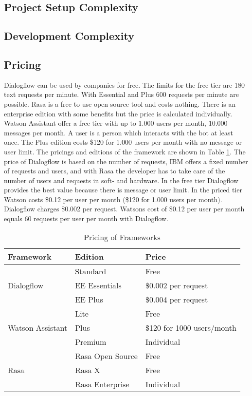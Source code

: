 \subsection*{Project Setup Complexity}

\subsection*{Development Complexity}
\subsection*{Pricing} \label{sec:pricing}
Dialogflow can be used by companies for free.
The limits for the free tier are 180 text requests per minute.
With Essential and Plus 600 requests per minute are possible.
Rasa is a free to use open source tool and costs nothing.
There is an enterprise edition with some benefits but the price
is calculated individually.
Watson Assistant offer a free tier with up to 1.000 users per month, 
10.000 messages per month.
A user is a person which interacts with the bot at least once.
The Plus edition costs \$120 for 1.000 users per month with
no message or user limit.
The pricings and editions of the framework are shown in Table \ref{tab:pricing}.
The price of Dialogflow is based on the number of requests,
IBM offers a fixed number of requests and users, and with Rasa the developer has
to take care of the number of users and requests in soft- and hardware.
In the free tier Dialogflow provides the best value because there is message or user limit.
In the priced tier Watson costs \$0.12 per user per month (\$120 for 1.000 users per month).
Dialogflow charges \$0.002 per request.
Watsons cost of \$0.12 per user per month equals 60 requests per user per month with Dialogflow.


\begin{table}[H]
    \centering
    \begin{tabular}{ l | l | l }
        Framework & Edition & Price \\ \hline \hline
        \multirow{3}{*}{Dialogflow} & Standard & Free \\
        & EE Essentials &  \$0.002 per request\\
        & EE Plus & \$0.004 per request \\ \hline

        \multirow{3}{*}{Watson Assistant} & Lite & Free \\
        & Plus &  \$120 for 1000 users/month\\
        & Premium & Individual \\ \hline

        \multirow{3}{*}{Rasa} & Rasa Open Source & Free \\
        & Rasa X &  Free\\
        & Rasa Enterprise & Individual \\ \hline
    \end{tabular}
    \caption{Pricing of Frameworks \cite{rasa, dialogflow, watsonassistant}} \label{tab:pricing}
\end{table} \noindent


